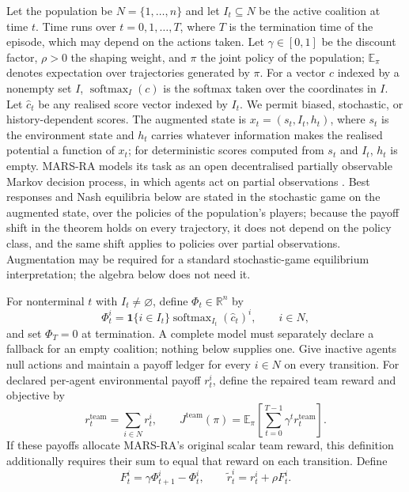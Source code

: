 \documentclass{article}
\begin{document}
Let the population be \(N=\{1,\ldots,n\}\) and let \(I_t\subseteq N\) be the active coalition at time \(t\). Time runs over \(t=0,1,\ldots,T\), where \(T\) is the termination time of the episode, which may depend on the actions taken. Let \(\gamma\in[0,1]\) be the discount factor, \(\rho>0\) the shaping weight, and \(\pi\) the joint policy of the population; \(\mathbb E_\pi\) denotes expectation over trajectories generated by \(\pi\). For a vector \(c\) indexed by a nonempty set \(I\), \(\operatorname{softmax}_I(c)\) is the softmax taken over the coordinates in \(I\). Let \(\widehat c_t\) be any realised score vector indexed by \(I_t\). We permit biased, stochastic, or history-dependent scores. The augmented state is \(x_t=(s_t,I_t,h_t)\), where \(s_t\) is the environment state and \(h_t\) carries whatever information makes the realised potential a function of \(x_t\); for deterministic scores computed from \(s_t\) and \(I_t\), \(h_t\) is empty. MARS-RA models its task as an open decentralised partially observable Markov decision process, in which agents act on partial observations \cite{wang2026marsra}. Best responses and Nash equilibria below are stated in the stochastic game on the augmented state, over the policies of the population's players; because the payoff shift in the theorem holds on every trajectory, it does not depend on the policy class, and the same shift applies to policies over partial observations. Augmentation may be required for a standard stochastic-game equilibrium interpretation; the algebra below does not need it.

For nonterminal \(t\) with \(I_t\ne\varnothing\), define \(\Phi_t\in\mathbb R^n\) by
\begin{equation}
 \Phi_t^i=\mathbf 1\{i\in I_t\}
 \operatorname{softmax}_{I_t}(\widehat c_t)^i,
 \qquad i\in N,
 \label{eq:embedding}
\end{equation}
and set \(\Phi_T=0\) at termination. A complete model must separately declare a fallback for an empty coalition; nothing below supplies one. Give inactive agents null actions and maintain a payoff ledger for every \(i\in N\) on every transition. For declared per-agent environmental payoff \(r_t^i\), define the repaired team reward and objective by
\begin{equation}
 r_t^{\mathrm{team}}=\sum_{i\in N}r_t^i,
 \qquad
 J^{\mathrm{team}}(\pi)=
 \mathbb E_{\pi}\!\left[\sum_{t=0}^{T-1}\gamma^t
 r_t^{\mathrm{team}}\right].
 \label{eq:team-objective}
\end{equation}
If these payoffs allocate MARS-RA's original scalar team reward, this definition additionally requires their sum to equal that reward on each transition. Define
\begin{equation}
 F_t^i=\gamma\Phi_{t+1}^i-\Phi_t^i,
 \qquad \widetilde r_t^i=r_t^i+\rho F_t^i.
 \label{eq:shaping}
\end{equation}
\end{document}
